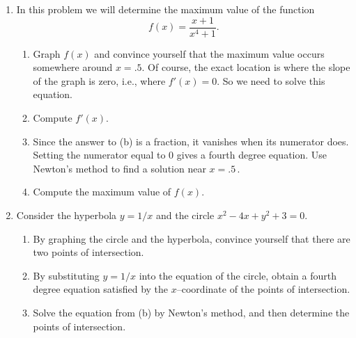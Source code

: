 \begin{enumerate}
\begin{enumerate}
  \item Try starting with $x_0=1$.  What happens? Explain graphically
what goes wrong.

This method for computing reciprocals is important because it involves
only {\em multiplication\/} and {\em subtraction\/}.  Since
$a/b=a\cdot (1/b)$, this implies that division can likewise be built
from multiplication and subtraction.  Thus, when designing a computer,
the division routine doesn't need to be built from scratch---the
designer can use the method illustrated here.  There are some
computers that do division this way.


\end{enumerate}
\item In this problem we will determine the maximum value of the function
\[
f(x) = \dfrac{x+1}{x^4+1}.
\]


  \begin{enumerate}
  \item Graph $f(x)$ and convince yourself that the maximum value occurs
somewhere around $x=.5$.  Of course, the exact location is where the
slope of the graph is zero, i.e., where $f'(x)=0$.  So we need to
solve this equation.

  \item Compute $f'(x)$.

  \item Since the answer to (b) is a fraction, it vanishes when its
numerator does.  Setting the numerator equal to 0 gives a fourth
degree equation.  Use Newton's method to find a solution near $x=.5 \,
.$


  \item Compute the maximum value of $f(x)$.


\end{enumerate}
\item Consider the hyperbola $y=1/x$ and the circle $x^2-4x+y^2+3=0$.

  \begin{enumerate}
  \item By graphing the circle and the hyperbola, convince yourself that
there are two points of intersection.

  \item By substituting $y=1/x$ into the equation of the circle, obtain a
fourth degree equation satisfied by the $x$--coordinate of the points
of intersection.

  \item Solve the equation from (b) by Newton's method, and then
determine the points of intersection.



\end{enumerate}
\end{enumerate}
